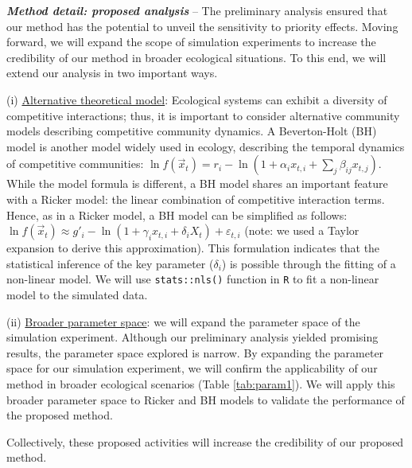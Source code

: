 \documentclass[12pt, class=article, crop=false]{standalone}
\begin{document}
\textbf{\textit{Method detail: proposed analysis}} -- 
The preliminary analysis ensured that our method has the potential to unveil the sensitivity to priority effects.
Moving forward, we will expand the scope of simulation experiments to increase the credibility of our method in broader ecological situations.
To this end, we will extend our analysis in two important ways.

(i) \ul{Alternative theoretical model}:
Ecological systems can exhibit a diversity of competitive interactions; thus, it is important to consider alternative community models describing competitive community dynamics. 
A Beverton-Holt (BH) model is another model widely used in ecology, describing the temporal dynamics of competitive communities: $\ln f(\overset{\rightarrow}{x}_{t}) = r_i - \ln(1 + \alpha_i x_{t,i} + \sum_j \beta_{ij} x_{t,j})$. 
While the model formula is different, a BH model shares an important feature with a Ricker model: the linear combination of competitive interaction terms.
Hence, as in a Ricker model, a BH model can be simplified as follows: $\ln f(\overset{\rightarrow}{x}_{t}) \approx g'_{i} - \ln(1 + \gamma_i x_{t,i} + \delta_i X_t) + \varepsilon_{t,i}$ (note: we used a Taylor expansion to derive this approximation).
This formulation indicates that the statistical inference of the key parameter ($\delta_i$) is possible through the fitting of a non-linear model.
We will use \texttt{stats::nls()} function in \texttt{R} to fit a non-linear model to the simulated data.

(ii) \ul{Broader parameter space}: we will expand the parameter space of the simulation experiment.
Although our preliminary analysis yielded promising results, the parameter space explored is narrow.
By expanding the parameter space for our simulation experiment,  we will confirm the applicability of our method in broader ecological scenarios (Table \ref{tab:param1}).
We will apply this broader parameter space to Ricker and BH models to validate the performance of the proposed method.

Collectively, these proposed activities will increase the credibility of our proposed method.
\end{document}
